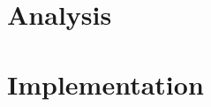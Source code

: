 \documentclass[12pt,a4paper]{report}
\begin{document}
    
    
    
    
    \tableofcontents
    
    \chapter{Analysis}
    

    \chapter{Implementation}
    
    
\end{document}
